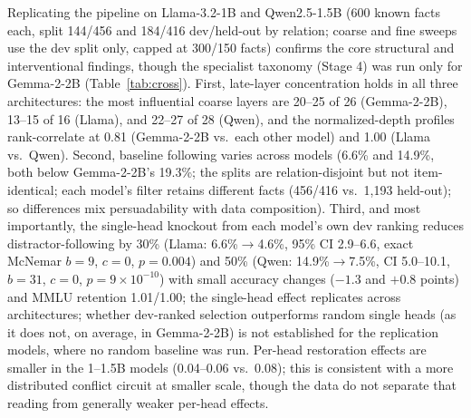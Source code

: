\documentclass[paper]{ieice}
\newcommand{\emodel}{Gemma-2-2B}
\begin{document}
Replicating the pipeline on Llama-3.2-1B and Qwen2.5-1.5B (600 known
facts each, split 144/456 and 184/416 dev/held-out by relation; coarse
and fine sweeps use the dev split only, capped at 300/150 facts)
confirms the core structural
and interventional findings, though the specialist taxonomy (Stage 4)
was run only for \emodel{} (Table~\ref{tab:cross}). First, late-layer
concentration holds in all three architectures: the most influential
coarse layers are 20--25 of 26 (\emodel{}), 13--15 of 16 (Llama), and
22--27 of 28 (Qwen), and the normalized-depth profiles rank-correlate at
0.81 (\emodel{} vs.\ each other model) and 1.00 (Llama vs.\ Qwen).
Second, baseline following varies across models (6.6\% and 14.9\%,
both below \emodel{}'s 19.3\%; the splits are relation-disjoint but not
item-identical; each model's filter retains different facts (456/416
vs.\ 1{,}193 held-out); so differences mix persuadability with data
composition).
Third, and most importantly, the single-head knockout from each model's
own dev ranking reduces distractor-following by 30\% (Llama:
6.6\%$\to$4.6\%, 95\% CI 2.9--6.6, exact McNemar $b{=}9$, $c{=}0$,
$p{=}0.004$) and 50\%
(Qwen: 14.9\%$\to$7.5\%, CI 5.0--10.1, $b{=}31$, $c{=}0$,
$p{=}9\times10^{-10}$) with small
accuracy changes ($-1.3$ and $+0.8$ points) and MMLU retention
1.01/1.00; the single-head effect replicates across architectures;
whether dev-ranked selection outperforms random single heads (as it
does not, on average, in \emodel{}) is not established for the
replication models, where no random baseline was run. Per-head restoration effects are smaller in the
1--1.5B models (0.04--0.06 vs.\ 0.08); this is consistent with a more
distributed conflict circuit at smaller scale, though the data do not
separate that reading from generally weaker per-head effects.
\end{document}
